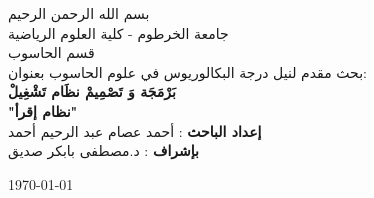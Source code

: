 \begin{titlepage}

\begin{center}

 بسم الله الرحمن الرحيم\\[0.8cm] 


جامعة الخرطوم - كلية العلوم الرياضية \\ قسم الحاسوب \\ [5cm]

\textsc{\Large بحث مقدم لنيل درجة البكالوريوس في علوم الحاسوب بعنوان:}\\[0.9cm]



{ \huge \textbf{بَرْمَجَة وَ تَصْمِيمْ نظَام تَشْغِيلْ\\[0.3cm] \large{"نظام إقرأ"}}}\\[3cm]




\textbf{إعداد الباحث} : أحمد عصام عبد الرحيم أحمد \\
\textbf{بإشراف} : د.مصطفى بابكر صديق



\vfill

{\large \today}

\end{center}

\end{titlepage}